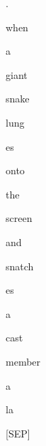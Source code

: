 \documentclass[varwidth=150mm]{standalone}
\begin{document}
\begin{CJK*}{UTF8}{gbsn}
{{{\colorbox{red!0.0}{\strut .} \colorbox{red!22.162782669067383}{\strut when} \colorbox{red!4.094794750213623}{\strut a} \colorbox{red!2.1828420162200928}{\strut giant} \colorbox{red!7.217385768890381}{\strut snake} \colorbox{red!0.0}{\strut lung}\colorbox{red!0.0}{\strut es} \colorbox{red!0.0}{\strut onto} \colorbox{red!1.6798624992370605}{\strut the} \colorbox{red!5.581048488616943}{\strut screen} \colorbox{red!2.0158302783966064}{\strut and} \colorbox{red!0.0}{\strut snatch}\colorbox{red!1.0797488689422607}{\strut es} \colorbox{red!6.503774642944336}{\strut a} \colorbox{red!8.116731643676758}{\strut cast} \colorbox{red!1.9876086711883545}{\strut member} \colorbox{red!1.070427656173706}{\strut a} \colorbox{red!4.49625301361084}{\strut la} \colorbox{red!4.4189133644104}{\strut [SEP]}
}}}
\end{CJK*}
\end{document}
